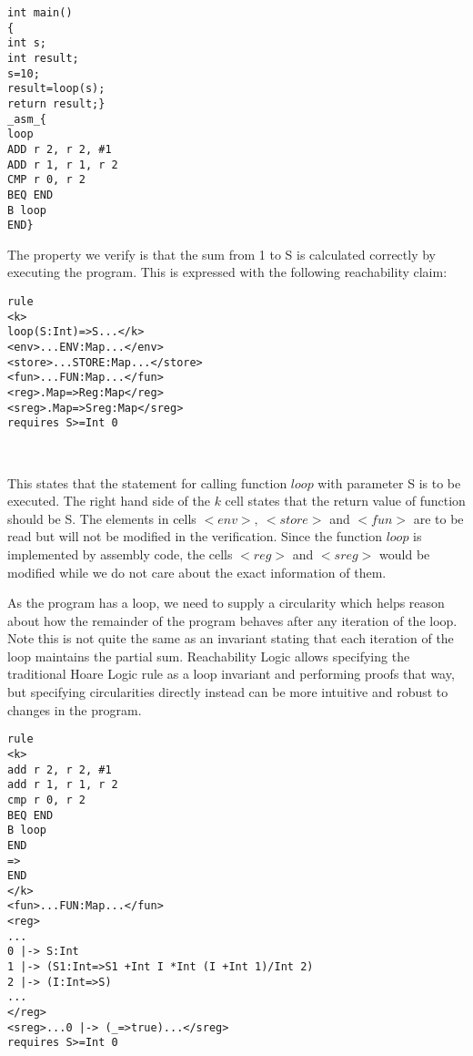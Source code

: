 \documentclass[letterpaper, 10 pt, conference]{IEEEtran}
\begin{document}
\vspace{11pt}
\begin{lstlisting}
int main()
{
int s;
int result;
s=10;
result=loop(s);
return result;}
_asm_{
loop
ADD r 2, r 2, #1
ADD r 1, r 1, r 2
CMP r 0, r 2
BEQ END
B loop
END}
\end{lstlisting}
\vspace{11pt}

\par The property we verify is that the sum from 1 to S is calculated correctly by executing the program. This is expressed with the following reachability claim:

\vspace{11pt}
\lstset{style=k}
\begin{minipage}{0.7\textwidth}
\begin{BVerbatim}
rule
<k>
loop(S:Int)=>S...</k>
<env>...ENV:Map...</env>
<store>...STORE:Map...</store>
<fun>...FUN:Map...</fun>
<reg>.Map=>Reg:Map</reg>
<sreg>.Map=>Sreg:Map</sreg>
requires S>=Int 0
\end{BVerbatim}
\end{minipage}\\
\vspace{11pt}

\par This states that the statement for calling function $loop$ with parameter S is to be executed. The right hand side of the $k$ cell states that the return value of function should be S. The elements in cells $<env>,~<store>$ and $<fun>$ are to be read but will not be modified in the verification. Since the function $loop$ is implemented by assembly code, the cells $<reg>$ and $<sreg>$ would be modified while we do not care about the exact information of them.
\par As the program has a loop, we need to supply a circularity which helps
reason about how the remainder of the program behaves after any iteration of the loop. Note this is not quite
the same as an invariant stating that each iteration of the loop maintains the partial sum. Reachability Logic allows specifying the traditional Hoare Logic rule as a loop invariant and performing proofs that way, but specifying circularities directly instead can be more intuitive and robust to changes in the program.\\
\vspace{11pt}

\lstset{style=k}
\begin{minipage}{0.35\textwidth}
\begin{BVerbatim}
rule
<k>
add r 2, r 2, #1
add r 1, r 1, r 2
cmp r 0, r 2
BEQ END
B loop
END
=>
END
</k>
<fun>...FUN:Map...</fun>
<reg>
...
0 |-> S:Int
1 |-> (S1:Int=>S1 +Int I *Int (I +Int 1)/Int 2)
2 |-> (I:Int=>S)
...
</reg>
<sreg>...0 |-> (_=>true)...</sreg>
requires S>=Int 0
\end{BVerbatim}
\end{minipage}\\
\vspace{11pt}
\end{document}
